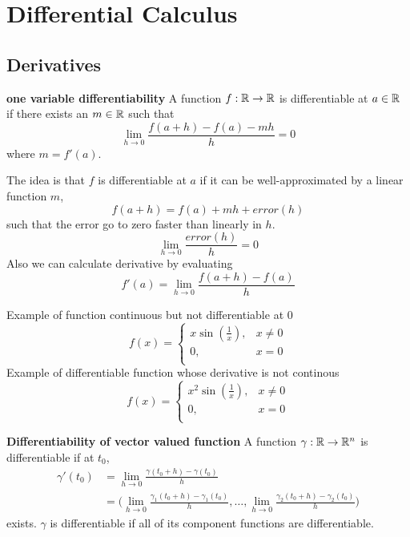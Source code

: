\documentclass[11pt]{article}
\begin{document}
\section*{Differential Calculus}

\subsection*{Derivatives}

\begin{defn}
  \label{one variable differentiability}
  \textbf{one variable differentiability} A function $f: \mathbb{R} \rightarrow \mathbb{R}$ is differentiable at $a\in\mathbb{R}$ if there exists an $m\in\mathbb{R}$ such that
  \[
    \lim_{h\to 0} \frac{f(a+h) - f(a) - mh}{h} = 0
  \]
  where $m=f'(a)$.
  \begin{rem}
    $ $\\
    The idea is that $f$ is differentiable at $a$ if it can be well-approximated by a linear function $m$,
    \[
      f(a+h) = f(a) + mh + error(h)
    \]
    such that the error go to zero faster than linearly in $h$.
    \[
      \lim_{h\to 0} \frac{error(h)}{h} = 0
    \]
    Also we can calculate derivative by evaluating
    \[
      f'(a) = \lim_{h\to 0} \frac{f(a+h)- f(a)}{h}
    \]
  \end{rem}
\end{defn}


\begin{note}
  Example of function continuous but not differentiable at 0
  \[
    f(x) =
    \begin{cases}
      x\sin(\frac{1}{x}), & x\neq 0\\
      0,& x = 0\\
    \end{cases}
  \]
  Example of differentiable function whose derivative is not continous
  \[
    f(x) =
    \begin{cases}
      x^2\sin(\frac{1}{x}), & x\neq 0\\
      0,& x = 0\\
    \end{cases}
  \]
\end{note}

\begin{defn}
  \label{Vector valued differentiability}
  \textbf{Differentiability of vector valued function} A function $\gamma: \mathbb{R}\rightarrow \mathbb{R}^n$ is differentiable if at $t_0$,
  \begin{align*}
    \gamma'(t_0) &= \lim_{h\to 0} \frac{\gamma(t_0 + h) - \gamma(t_0)}{h}\\
    &= \big( \lim_{h\to 0} \frac{\gamma_1(t_0 + h) - \gamma_1(t_0)}{h}, \dots,  \lim_{h\to 0} \frac{\gamma_2(t_0 + h) - \gamma_2(t_0)}{h} \big)
  \end{align*}
  exists. $\gamma$ is differentiable if all of its component functions are differentiable.
\end{defn}
\end{document}
